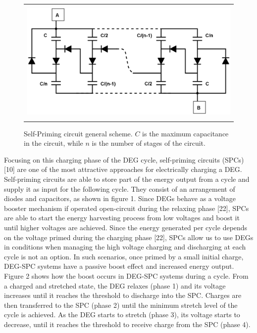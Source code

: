 \begin{figure}[ht]
\begin{center}
\begin{tabular}{c}
\includegraphics[height=6cm]{fig04/SPC_general.png}
\end{tabular}
\end{center}
\caption 
{ \label{fig:SPC_general}
Self-Priming circuit general scheme. $C$ is the maximum capacitance in the circuit, while $n$ is the number of stages of the circuit.}
\end{figure}  

Focusing on this charging phase of the DEG cycle, self-priming circuits (SPCs) [10] are one of the most attractive approaches for electrically charging a DEG. Self-priming circuits are able to store part of the energy output from a cycle and supply it as input for the following cycle. They consist of an arrangement of diodes and capacitors, as shown in figure 1. Since DEGs behave as a voltage booster mechanism if operated open-circuit during the relaxing phase [22], SPCs are able to start the energy harvesting process from low voltages and boost it until higher voltages are achieved. Since the energy generated per cycle depends on the voltage primed during the charging phase [22], SPCs allow us to use DEGs in conditions when managing the high voltage charging and discharging at each cycle is not an option. In such scenarios, once primed by a small initial charge, DEG-SPC systems have a passive boost effect and increased energy output. Figure 2 shows how the boost occurs in DEG-SPC systems during a cycle. From a charged and stretched state, the DEG relaxes (phase 1) and its voltage increases until it reaches the threshold to discharge into the SPC. Charges are then transferred to the SPC (phase 2) until the minimum stretch level of the cycle is achieved. As the DEG starts to stretch (phase 3), its voltage starts to decrease, until it reaches the threshold to receive charge from the SPC (phase 4).

